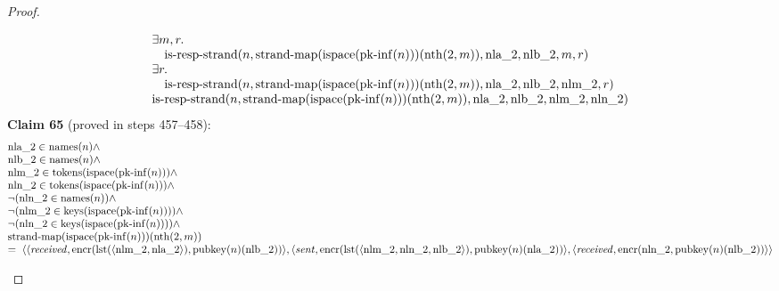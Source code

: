\documentclass[11pt]{article}
\theoremstyle{plain}
\begin{document}
\begin{proof}
\begin{itemize}[leftmargin=2.8em, itemsep=4pt, parsep=1pt]
\begin{itemize}[leftmargin=2.8em, itemsep=4pt, parsep=1pt]
\begin{equation*}
\begin{array}{@{}l@{}}
\begin{array}{@{}l@{}} \exists m, r. \\ \quad \operatorname{is\text{-}resp\text{-}strand}(n, \operatorname{strand\text{-}map}(\operatorname{ispace}(\operatorname{pk\text{-}inf}(n)))(\operatorname{nth}(2, m)), \operatorname{nla\_2}, \operatorname{nlb\_2}, m, r) \end{array} \\
\begin{array}{@{}l@{}} \exists r. \\ \quad \operatorname{is\text{-}resp\text{-}strand}(n, \operatorname{strand\text{-}map}(\operatorname{ispace}(\operatorname{pk\text{-}inf}(n)))(\operatorname{nth}(2, m)), \operatorname{nla\_2}, \operatorname{nlb\_2}, \operatorname{nlm\_2}, r) \end{array} \\
\operatorname{is\text{-}resp\text{-}strand}(n, \operatorname{strand\text{-}map}(\operatorname{ispace}(\operatorname{pk\text{-}inf}(n)))(\operatorname{nth}(2, m)), \operatorname{nla\_2}, \operatorname{nlb\_2}, \operatorname{nlm\_2}, \operatorname{nln\_2})
\end{array}
\end{equation*}
\textbf{Claim 65} (proved in steps 457--458):
\begin{equation*}
\begin{array}{@{}l@{}} \operatorname{nla\_2} \in \operatorname{names}(n) \wedge \\ \operatorname{nlb\_2} \in \operatorname{names}(n) \wedge \\ \operatorname{nlm\_2} \in \operatorname{tokens}(\operatorname{ispace}(\operatorname{pk\text{-}inf}(n))) \wedge \\ \operatorname{nln\_2} \in \operatorname{tokens}(\operatorname{ispace}(\operatorname{pk\text{-}inf}(n))) \wedge \\ \neg (\operatorname{nln\_2} \in \operatorname{names}(n)) \wedge \\ \neg (\operatorname{nlm\_2} \in \operatorname{keys}(\operatorname{ispace}(\operatorname{pk\text{-}inf}(n)))) \wedge \\ \neg (\operatorname{nln\_2} \in \operatorname{keys}(\operatorname{ispace}(\operatorname{pk\text{-}inf}(n)))) \wedge \\ \operatorname{strand\text{-}map}(\operatorname{ispace}(\operatorname{pk\text{-}inf}(n)))(\operatorname{nth}(2, m)) \\ =\; \langle \langle \mathit{received}, \operatorname{encr}(\operatorname{lst}(\langle \operatorname{nlm\_2}, \operatorname{nla\_2} \rangle), \operatorname{pubkey}(n)(\operatorname{nlb\_2})) \rangle, \langle \mathit{sent}, \operatorname{encr}(\operatorname{lst}(\langle \operatorname{nlm\_2}, \operatorname{nln\_2}, \operatorname{nlb\_2} \rangle), \operatorname{pubkey}(n)(\operatorname{nla\_2})) \rangle, \langle \mathit{received}, \operatorname{encr}(\operatorname{nln\_2}, \operatorname{pubkey}(n)(\operatorname{nlb\_2})) \rangle \rangle \end{array}

\end{equation*}
\end{itemize}
\end{itemize}
\end{proof}
\end{document}

